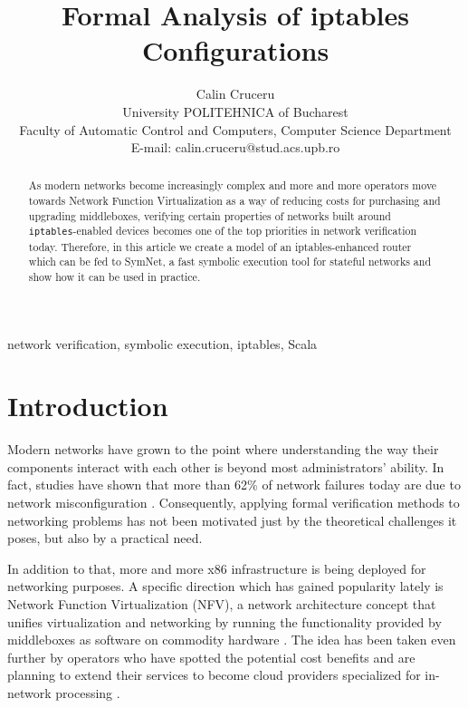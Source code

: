 \documentclass[twoside, 11pt, a4paper]{article}
\begin{document}
\title{Formal Analysis of iptables Configurations}

\author{\name Calin Cruceru\\
       \addr University POLITEHNICA of Bucharest\\
       Faculty of Automatic Control and Computers, Computer Science Department\\
       \email E-mail: calin.cruceru@stud.acs.upb.ro}

\maketitle

\begin{abstract}

As modern networks become increasingly complex and more and more operators move
towards Network Function Virtualization as a way of reducing costs for
purchasing and upgrading middleboxes, verifying certain properties of
networks built around \texttt{iptables}-enabled devices becomes one of the
top priorities in network verification today.  Therefore, in this article we
create a model of an iptables-enhanced router which can be fed to SymNet, a
fast symbolic execution tool for stateful networks and show how it can be
used in practice.

\end{abstract}

\begin{keywords}
network verification, symbolic execution, iptables, Scala
\end{keywords}

\section{Introduction}
Modern networks have grown to the point where understanding the way their
components interact with each other is beyond most administrators' ability. In
fact, studies have shown that more than 62\% of network failures today are due
to network misconfiguration \cite{alimi2008shadow}. Consequently, applying
formal verification methods to networking problems has not been motivated just
by the theoretical challenges it poses, but also by a practical need.

In addition to that, more and more x86 infrastructure is being deployed for
networking purposes. A specific direction which has gained popularity lately
is Network Function Virtualization (NFV), a network architecture concept that
unifies virtualization and networking by running the functionality provided by
middleboxes as software on commodity hardware \cite{stoenescu2015net}. The idea
has been taken even further by operators who have spotted the potential cost
benefits and are planning to extend their services to become cloud providers
specialized for in-network processing \cite{stoenescu2015net}.
\end{document}
